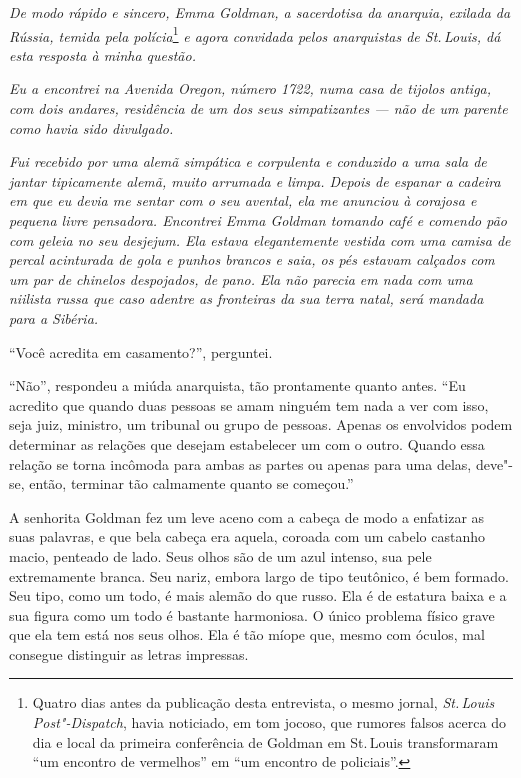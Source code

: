 \noindent{}\textit{De modo rápido e sincero, Emma Goldman, a sacerdotisa da anarquia,
exilada da Rússia, temida pela polícia}\footnote{Quatro dias antes da publicação desta entrevista, o mesmo jornal, \textit{St.\,Louis Post"-Dispatch}, havia noticiado, em tom jocoso, que rumores falsos acerca do dia e local da primeira conferência de Goldman em St.\,Louis transformaram ``um encontro de vermelhos'' em ``um encontro de policiais''.} \textit{e agora convidada
pelos anarquistas de St.\,Louis, dá esta resposta à minha questão.}

\textit{Eu a encontrei na Avenida Oregon, número 1722, numa casa
de tijolos antiga, com dois andares, residência de um dos seus
simpatizantes --- não de um parente como havia sido divulgado.}

\textit{Fui recebido por uma alemã simpática e corpulenta e conduzido a uma sala de jantar tipicamente alemã, muito arrumada e limpa. Depois de espanar a
cadeira em que eu devia me sentar com o seu avental, ela me anunciou à
corajosa e pequena livre pensadora. Encontrei Emma Goldman tomando café
e comendo pão com geleia no seu desjejum. Ela estava elegantemente
vestida com uma camisa de percal acinturada de gola e punhos brancos e
saia, os pés estavam calçados com um par de chinelos despojados, de
pano. Ela não parecia em nada com uma niilista russa que caso adentre as
fronteiras da sua terra natal, será mandada para a Sibéria.}

\begin{center}\end{center}

``Você acredita em casamento?'', perguntei.

``Não'', respondeu a miúda anarquista, tão prontamente quanto antes.
``Eu acredito que quando duas pessoas se amam ninguém tem nada a ver com
isso, seja juiz, ministro, um tribunal ou grupo de pessoas.
Apenas os envolvidos podem determinar as relações que desejam estabelecer um com o
outro. Quando essa relação se torna incômoda para ambas as partes ou
apenas para uma delas, deve"-se, então, terminar tão calmamente quanto se
começou.''

A senhorita Goldman fez um leve aceno com a cabeça de modo a enfatizar
as suas palavras, e que bela cabeça era aquela, coroada com um cabelo
castanho macio, penteado de lado. Seus olhos são de um azul intenso,
sua pele extremamente branca. Seu nariz, embora largo de tipo
teutônico, é bem formado. Seu tipo, como um todo, é mais alemão do que
russo. Ela é de estatura baixa e a sua figura como um todo é bastante harmoniosa.
O único problema físico grave que ela tem está nos seus olhos. Ela é tão míope que,
mesmo com óculos, mal consegue distinguir as letras impressas.


